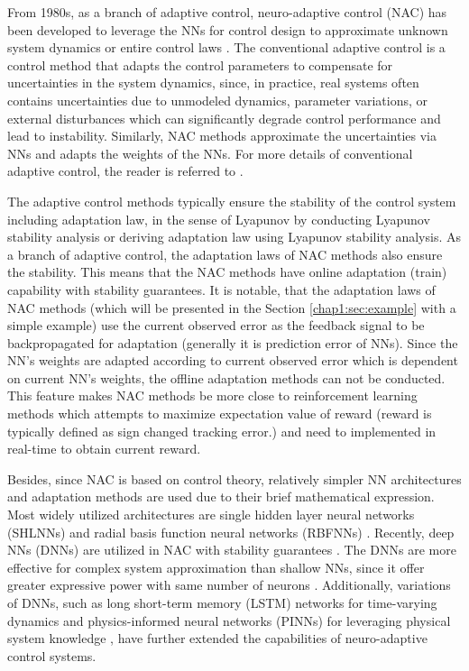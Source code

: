 From 1980s, as a branch of adaptive control, neuro-adaptive control (NAC) has been developed to leverage the NNs for control design to approximate unknown system dynamics or entire control laws \cite{RN5, RN48}.
The conventional adaptive control is a control method that adapts the control parameters to compensate for uncertainties in the system dynamics, since, in practice, real systems often contains uncertainties due to unmodeled dynamics, parameter variations, or external disturbances which can significantly degrade control performance and lead to instability. 
Similarly, NAC methods approximate the uncertainties via NNs and adapts the weights of the NNs.
For more details of conventional adaptive control, the reader is referred to \cite{RN6, RN10}. 

The adaptive control methods typically ensure the stability of the control system including adaptation law, in the sense of Lyapunov by conducting Lyapunov stability analysis or deriving adaptation law using Lyapunov stability analysis.
As a branch of adaptive control, the adaptation laws of NAC methods also ensure the stability. 
This means that the NAC methods have online adaptation (train) capability with stability guarantees. 
It is notable, that the adaptation laws of NAC methods (which will be presented in the Section \ref{chap1:sec:example} with a simple example) use the current observed error as the feedback signal to be backpropagated for adaptation (\ie generally it is prediction error of NNs). 
Since the NN’s weights are adapted according to current observed error which is dependent on current NN’s weights, the offline adaptation methods can not be conducted. 
This feature makes NAC methods be more close to reinforcement learning methods which attempts to maximize expectation value of reward (\ie reward is typically defined as sign changed tracking error.) and need to implemented in real-time to obtain current reward.

Besides, since NAC is based on control theory, relatively simpler NN architectures and adaptation methods are used due to their brief mathematical expression.
Most widely utilized architectures are single hidden layer neural networks (SHLNNs) \cite{RN69, RN18, RN85, RN46, RN95, RN108} and radial basis function neural networks (RBFNNs) \cite{RN89, RN82, RN64, RN71, RN19, RN21}.
Recently, deep NNs (DNNs) are utilized in NAC with stability guarantees \cite{RN13}.
The DNNs are more effective for complex system approximation than shallow NNs, since it offer greater expressive power with same number of neurons \cite{RN65}.
Additionally, variations of DNNs, such as long short-term memory (LSTM) networks for time-varying dynamics \cite{RN11} and physics-informed neural networks (PINNs) for leveraging physical system knowledge \cite{RN12}, have further extended the capabilities of neuro-adaptive control systems.

